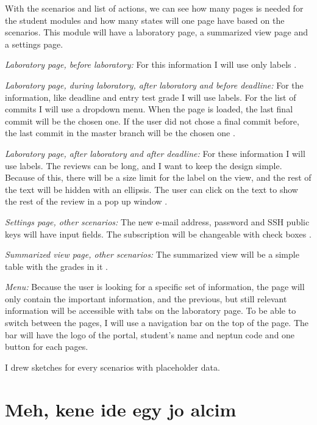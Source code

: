 With the scenarios and list of actions, we can see how many pages is needed for the student modules and how many states will one page have based on the scenarios. This module will have a laboratory page, a summarized view page and a settings page.

\emph{Laboratory page, before laboratory:} For this information I will use only labels .

\emph{Laboratory page, during laboratory, after laboratory and before deadline:} For the information, like deadline and entry test grade I will use labels. For the list of commits I will use a dropdown menu. When the page is loaded, the last final commit will be the chosen one. If the user did not chose a final commit before, the last commit in the master branch will be the chosen one .

\emph{Laboratory page, after laboratory and after deadline:} For these information I will use labels. The reviews can be long, and I want to keep the design simple. Because of this, there will be a size limit for the label on the view, and the rest of the text will be hidden with an ellipsis. The user can click on the text to show the rest of the review in a pop up window .

\emph{Settings page, other scenarios:} The new e-mail address, password and SSH public keys will have input fields. The subscription will be changeable with check boxes . 

\emph{Summarized view page, other scenarios:} The summarized view will be a simple table with the grades in it .

\emph{Menu:} Because the user is looking for a specific set of information, the page will only contain the important information, and the previous, but still relevant information will be accessible with tabs on the laboratory page. To be able to switch between the pages, I will use a navigation bar on the top of the page. The bar will have the logo of the portal, student's name and neptun code and one button for each pages.

I drew sketches  for every scenarios with placeholder data. 

\section{Meh, kene ide egy jo alcim}





